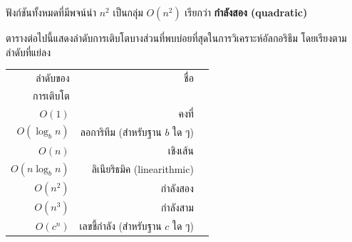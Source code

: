 
ฟังก์ชันทั้งหมดที่มีพจน์นำ {\scriptsize$n^2$} เป็นกลุ่ม {\scriptsize$O(n^2)$} เรียกว่า  {\bf กำลังสอง (quadratic)}

ตารางต่อไปนี้แสดงลำดับการเติบโตบางส่วนที่พบบ่อยที่สุดในการวิเคราะห์อัลกอริธึม โดยเรียงตามลำดับที่แย่ลง


\begin{tabular}{|r|r|r|}
\hline
ลำดับของ     &   ชื่อ      \\
การเติบโต       &               \\
\hline
{\scriptsize$O(1)$}             & คงที่ \\
{\scriptsize$O(\log_b n)$}      & ลอการิทึม (สำหรับฐาน {\scriptsize$b$} ใด ๆ) \\
{\scriptsize$O(n)$}             & เชิงเส้น \\
{\scriptsize$O(n \log_b n)$}    & ลิเนียริธมิค (linearithmic) \\
{\scriptsize$O(n^2)$}           & กำลังสอง     \\
{\scriptsize$O(n^3)$}           & กำลังสาม     \\
{\scriptsize$O(c^n)$}           & เลขชี้กำลัง (สำหรับฐาน {\scriptsize$c$} ใด ๆ)    \\
\hline
\end{tabular}



